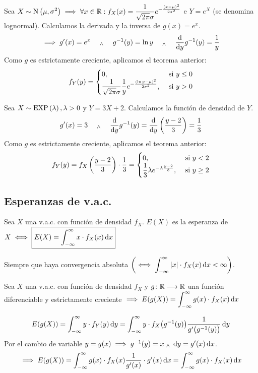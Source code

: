 \begin{ejem}
	Sea $\displaystyle X\sim\operatorname{N}\left(\mu, \sigma^2\right) \implies \forall x \in \mathbb{R}: f_X(x)=\frac{1}{\sqrt{2\pi}\sigma} e^{-\frac{(x-\mu)^2}{2\sigma^2}}$ e $Y=e^X$ (se denomina lognormal). Calculamos la derivada y la inversa de $g(x)=e^x$.
	\[\implies g'(x)=e^x \quad \we \quad  g^{-1} (y) = \ln{y} \quad \we \quad  \odv{}{y} g^{-1} (y) = \frac{1}{y}\]
	Como $g$ es estrictamente creciente, aplicamos el teorema anterior:
	\[f_Y(y) = \begin{cases}
			0,                                                                                 & \text{ si } y\leq 0 \\
			\ds \frac{1}{\sqrt{2\pi}\sigma} \frac{1}{y} e^{-\frac{(\ln{y}-\mu)^2}{2\sigma^2}}, & \text{ si } y>0     %
		\end{cases}\]
\end{ejem}

\begin{ejem}
	Sea $X\sim\operatorname{EXP}\left(\lambda\right), \lambda > 0$ y $Y=3X+2$. Calculamos la función de densidad de $Y$.
	\[g'(x) = 3 \quad \we \quad \odv{}{y} g^{-1}(y) = \odv{}{y}\left(\frac{y-2}{3}\right) = \frac{1}{3}\]
	Como $g$ es estrictamente creciente, aplicamos el teorema anterior:
	\[f_Y(y) = f_X\left(\frac{y-2}{3}\right) \cdot \frac{1}{3}= \begin{cases}
			0,                                                 & \text{ si } y<2     \\
			\displaystyle \frac{1}{3}\lambda e^{-\lambda \frac{y-2}{3}}, & \text{ si } y\geq 2
		\end{cases}\]
\end{ejem}

\subsection{Esperanzas de v.a.c.}
\begin{defn}[Esperanza]
	Sea $X$ una v.a.c. con función de densidad $f_X$. $E(X)$ es la esperanza de $X \ds \iff \boxed{E(X) = \int_{-\infty}^{\infty} x \cdot f_X(x) \odif{x}}$

	Siempre que haya convergencia absoluta $\ds \left(\iff \int_{-\infty}^{\infty} \abs{x} \cdot f_X(x) \odif{x} < \infty\right)$.
\end{defn}

\begin{teo}
	Sea $X$ una v.a.c. con función de densidad $f_X$ y $g \colon \mathbb{R} \longrightarrow \mathbb{R}$ una función diferenciable y estrictamente creciente $\ds \implies E(g(X)) = \int_{-\infty}^{\infty} g(x) \cdot f_X(x) \odif{x}$
	\begin{dem}
		\[E(g(X)) = \int_{-\infty}^{\infty} y \cdot f_Y(y) \odif{y} = \int_{-\infty}^{\infty} y \cdot f_X\big(g^{-1}(y)\big) \frac{1}{g'\big(g^{-1}(y)\big)} \odif{y}\]
		Por el cambio de variable $y=g(x)\implies g^{-1}(y) = x \we \odif{y} = g'(x) \odif{x}$.
		\[\implies E(g(X)) = \int_{-\infty}^{\infty} g(x) \cdot f_X(x) \frac{1}{g'(x)} \cdot g'(x) \odif{x} = \int_{-\infty}^{\infty} g(x) \cdot f_X(x) \odif{x}\]
	\end{dem}
\end{teo}

